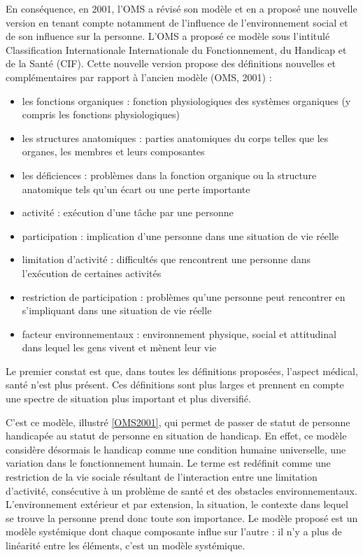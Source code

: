 En conséquence, en 2001, l'OMS a révisé son modèle et en a proposé une nouvelle version en tenant compte notamment de l'influence de l'environnement social et de son influence sur la personne. L'OMS a proposé ce modèle sous l'intitulé \og Classification Internationale Internationale du Fonctionnement, du Handicap et de la Santé\fg{} (CIF). Cette nouvelle version propose des définitions nouvelles et complémentaires par rapport à l'ancien modèle (OMS, 2001) \cite{OMS2001} :

\begin{itemize}
\item les fonctions organiques : fonction physiologiques des systèmes organiques (y compris les fonctions physiologiques) 
\item les structures anatomiques : parties anatomiques du corps telles que les organes, les membres et leurs composantes
\item les déficiences : problèmes dans la fonction organique ou la structure anatomique tels qu'un écart ou une perte importante
\item activité : exécution d'une tâche par une personne
\item participation : implication d'une personne dans une situation de vie réelle
\item limitation d'activité : difficultés que rencontrent une personne dans l'exécution de certaines activités
\item restriction de participation : problèmes qu'une personne peut rencontrer en s'impliquant dans une situation de vie réelle
\item facteur environnementaux : environnement physique, social et attitudinal dans lequel les gens vivent et mènent leur vie
\newline
\end{itemize}


Le premier constat est que, dans toutes les définitions proposées, l'aspect médical, santé n'est plus présent. Ces définitions sont plus larges et prennent en compte une spectre de situation plus important et plus diversifié.

C'est ce modèle, illustré \ref{OMS2001}, qui permet de passer de statut de \og personne handicapée\fg{} au statut de \og personne en situation de handicap\fg{}. En effet, ce modèle considère désormais le handicap comme une condition humaine universelle, une variation dans le fonctionnement humain. Le terme est redéfinit comme \og une restriction de la vie sociale résultant de l’interaction entre une limitation d’activité, consécutive à un problème de santé et des obstacles environnementaux.\fg{} L'environnement extérieur et par extension, la situation, le contexte dans lequel se trouve la personne prend donc toute son importance. Le modèle proposé est un modèle systémique dont chaque composante influe sur l'autre : il n'y a plus de linéarité entre les éléments, c'est un modèle systémique. 


